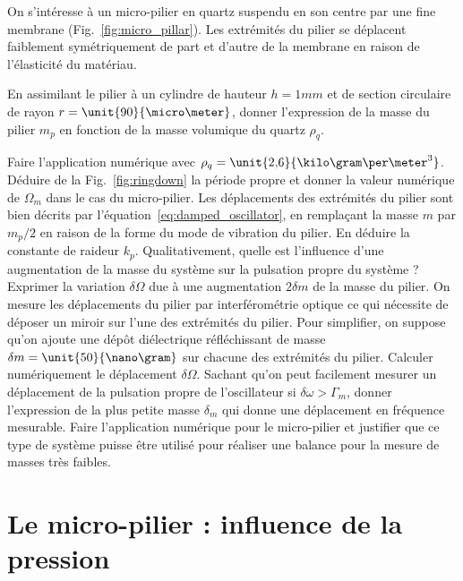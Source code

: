 \documentclass[12pt,a4paper]{exam}
\begin{document}
On s'intéresse à un micro-pilier en quartz suspendu en son centre par une fine membrane (Fig.~\ref{fig:micro_pillar}).
Les extrémités du pilier se déplacent faiblement symétriquement de part et d'autre de la membrane en raison de l'élasticité du matériau.

\begin{questions}
\question En assimilant le pilier à un cylindre de hauteur $h=\unit{1}{mm}$ et de section circulaire de rayon $r=\unit{90}{\micro\meter}$, donner l'expression de la masse du pilier $m_p$ en fonction de la masse volumique du quartz $\rho_q$.

Faire l'application numérique avec $\rho_q=\unit{2{,}6}{\kilo\gram\per\meter^3}$.
\question Déduire de la Fig.~\ref{fig:ringdown} la période propre et donner la valeur numérique de $\Omega_m$ dans le cas du micro-pilier. 
\question Les déplacements des extrémités du pilier sont bien décrits par l'équation~\eqref{eq:damped_oscillator}, en remplaçant la masse $m$ par $m_p/2$ en raison de la forme du mode de vibration du pilier.
En déduire la constante de raideur $k_p$.
\question Qualitativement, quelle est l'influence d'une augmentation de la masse du système sur la pulsation propre du système ?
Exprimer la variation $\delta\Omega$ due à une augmentation $2\delta m$ de la masse du pilier.
\question On mesure les déplacements du pilier par interférométrie optique ce qui nécessite de déposer un miroir sur l'une des extrémités du pilier.
Pour simplifier, on suppose qu'on ajoute une dépôt diélectrique réfléchissant de masse $\delta m = \unit{50}{\nano\gram}$ sur chacune des extrémités du pilier.
Calculer numériquement le déplacement $\delta\Omega$.
\question Sachant qu'on peut facilement mesurer un déplacement de la pulsation propre de l'oscillateur si $\delta\omega > \Gamma_m$, donner l'expression de la plus petite masse $\delta_m$ qui donne une déplacement en fréquence mesurable.
\question Faire l'application numérique pour le micro-pilier et justifier que ce type de système puisse être utilisé pour réaliser une balance pour la mesure de masses très faibles.
\end{questions}

\section{Le micro-pilier : influence de la pression}
\end{document}
